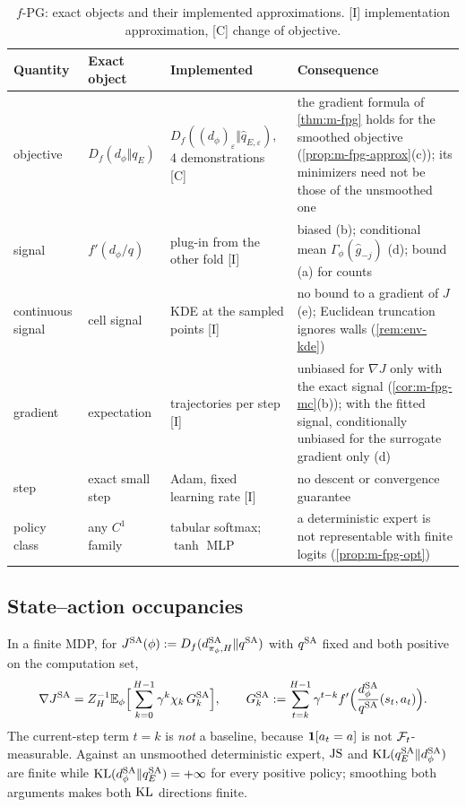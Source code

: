 \begin{table}[ht]
\centering\small
\caption{$f$-PG: exact objects and their implemented approximations. \textsf{[I]} implementation approximation, \textsf{[C]} change of objective.}\label{tab:fpg-ledger}
\begin{tabularx}{\textwidth}{@{}>{\raggedright\arraybackslash}p{2.6cm}>{\raggedright\arraybackslash}p{3.4cm}>{\raggedright\arraybackslash}p{3.6cm}>{\raggedright\arraybackslash}X@{}}
\toprule
Quantity & Exact object & Implemented & Consequence\\
\midrule
objective & $D_f(d_\phi\Vert q_E)$ & $D_f((d_\phi)_\varepsilon\Vert\hat q_{E,\varepsilon})$, 4 demonstrations \textsf{[C]} & the gradient formula of \cref{thm:m-fpg} holds for the smoothed objective (\cref{prop:m-fpg-approx}(c)); its minimizers need not be those of the unsmoothed one\\
signal & $f'(d_\phi/q)$ & plug-in from the other fold \textsf{[I]} & biased (b); conditional mean $\Gamma_\phi(\hat g_{-j})$ (d); bound (a) for counts\\
continuous signal & cell signal & KDE at the sampled points \textsf{[I]} & no bound to a gradient of $J$ (e); Euclidean truncation ignores walls (\cref{rem:env-kde})\\
gradient & expectation & 20 trajectories per step \textsf{[I]} & unbiased for $\nabla J$ only with the exact signal (\cref{cor:m-fpg-mc}(b)); with the fitted signal, conditionally unbiased for the surrogate gradient only (d)\\
step & exact small step & Adam, fixed learning rate \textsf{[I]} & no descent or convergence guarantee\\
policy class & any $C^1$ family & tabular softmax; $\tanh$ MLP & a deterministic expert is not representable with finite logits (\cref{prop:m-fpg-opt})\\
\bottomrule
\end{tabularx}
\end{table}

\subsection{State--action occupancies}

\begin{proposition}\label{prop:m-fpg-sa}
In a finite MDP, for $J^{\mathrm{SA}}(\phi):=D_f(d^{\mathrm{SA}}_{\pi_\phi,H}\Vert q^{\mathrm{SA}})$ with $q^{\mathrm{SA}}$ fixed and both positive on the computation set,
\[
\nabla J^{\mathrm{SA}}=Z_H^{-1}\mathbb{E}_\phi\Big[\sum_{k=0}^{H-1}\gamma^k\chi_k\,G^{\mathrm{SA}}_k\Big],\qquad G^{\mathrm{SA}}_k:=\sum_{t=k}^{H-1}\gamma^{t-k}f'\Big(\frac{d^{\mathrm{SA}}_\phi}{q^{\mathrm{SA}}}(s_t,a_t)\Big).
\]
The current-step term $t=k$ is \emph{not} a baseline, because $\mathbf{1}[a_t=a]$ is not $\mathcal{F}_t$-measurable.
Against an unsmoothed deterministic expert, $\mathrm{JS}$ and $\mathrm{KL}(q^{\mathrm{SA}}_E\Vert d^{\mathrm{SA}}_\phi)$ are finite while $\mathrm{KL}(d^{\mathrm{SA}}_\phi\Vert q^{\mathrm{SA}}_E)=+\infty$ for every positive policy; smoothing both arguments makes both $\mathrm{KL}$ directions finite.
\end{proposition}

